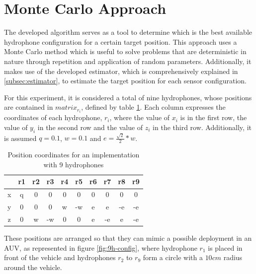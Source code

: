\section{Monte Carlo Approach} \label{sec:config-perf}

The developed algorithm serves as a tool to determine which is the best available hydrophone configuration for a certain target position. This approach uses a Monte Carlo method which is useful to solve problems that are deterministic in nature through repetition and application of random parameters. Additionally, it makes use of the developed estimator, which is comprehensively explained in \ref{subsec:estimator}, to estimate the target position for each sensor configuration.
		
For this experiment, it is considered a total of nine hydrophones, whose positions are contained in $matrix_{r_{i}}$, defined by table \ref{tab:config-9h}. Each column expresses the coordinates of each hydrophone, $r_i$, where the value of $x_i$ is in the first row, the value of $y_i$ in the second row and the value of $z_i$ in the third row. Additionally, it is assumed $q = 0.1$, $w = 0.1$ and $e = \frac{ \sqrt{2}}{2} * w$.

\begin{table}[!htbp] %
	\begin{center}
		\begin{tabular}{c | c c c c c c c c c}
			\toprule
			& r1 & r2 & r3 & r4	& r5 & r6 & r7 & r8	& r9 \\ \hline 
			\multirow{1}{0.5em}{x} 
			& q & 0 & 0 & 0 & 0 & 0 & 0 & 0 & 0\\
			\midrule 
			\multirow{1}{0.5em}{y} 
			& 0 & 0 & 0 & w & -w & e & e & -e & -e\\
			\midrule 
			\multirow{1}{0.5em}{z} 
			& 0 & w & -w & 0 & 0 & e & -e & e & -e \\
			\bottomrule 
		\end{tabular}
		\caption{Position coordinates for an implementation with 9 hydrophones}
		\label{tab:config-9h}
	\end{center}
\end{table}

These positions are arranged so that they can mimic a possible deployment in an AUV, as represented in figure \ref{fig:9h-config}, where hydrophone $r_1$ is placed in front of the vehicle and hydrophones $r_2$ to $r_9$ form a circle with a $10 cm$ radius around the vehicle.

